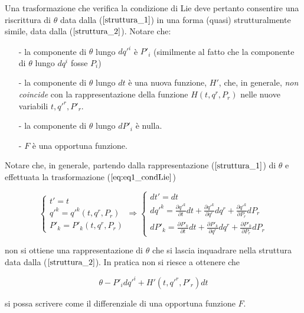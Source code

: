 Una trasformazione che verifica la condizione di Lie deve pertanto consentire una riscrittura di $ \theta $ data dalla ($ \ref{struttura_1} $) in una forma (quasi) strutturalmente simile, data dalla ($ \ref{struttura_2} $).
Notare che:
\begin{itemize}
\item[-] la componente di $ \theta $ lungo $ dq'^i $ è $ P'_i $ (similmente al fatto che la componente di $ \theta $ lungo $ dq^i $ fosse $ P_i $)
\item[-] la componente di $ \theta $ lungo $ dt $ è una nuova funzione, $ H' $, che, in generale, \textit{non coincide} con la rappresentazione della funzione $ H (t, q^r, P_r) $ nelle nuove variabili $ t, q'^r, P'_r $.
\item[-] la componente di $ \theta $ lungo $ dP'_i $ è nulla.
\item[-] $ F $ è una opportuna funzione.
\end{itemize}

Notare che, in generale, partendo dalla rappresentazione ($ \ref{struttura_1} $) di $ \theta $ e effettuata la trasformazione ($ \ref{eq:eq1_condLie} $)

\begin{equation*}
  \begin{cases}
    t' = t \\
    q'^k = q'^k (t, q^r, P_r) \\ 
    P'_k = P'_k (t, q^r, P_r)
  \end{cases}
  \Rightarrow
  \begin{cases}
    dt' = dt \\
    dq'^k = \frac{\partial q'^k}{\partial t} dt + \frac{\partial q'^k}{\partial q^r} dq^r + \frac{\partial q'^k}{\partial P_r} dP_r\\ 
    dP'_k = \frac{\partial P'_k}{\partial t} dt + \frac{\partial P'_k}{\partial q^r} dq^r + \frac{\partial P'_k}{\partial P_r} dP_r
  \end{cases}
\end{equation*}

non si ottiene una rappresentazione di $ \theta $ che si lascia inquadrare nella struttura data dalla ($ \ref{struttura_2} $). In pratica non si riesce a ottenere che

\begin{equation*}
  \theta - P'_i dq'^i + H' (t, q'^r, P'_r) dt
\end{equation*}

si possa scrivere come il differenziale di una opportuna funzione $ F $.

